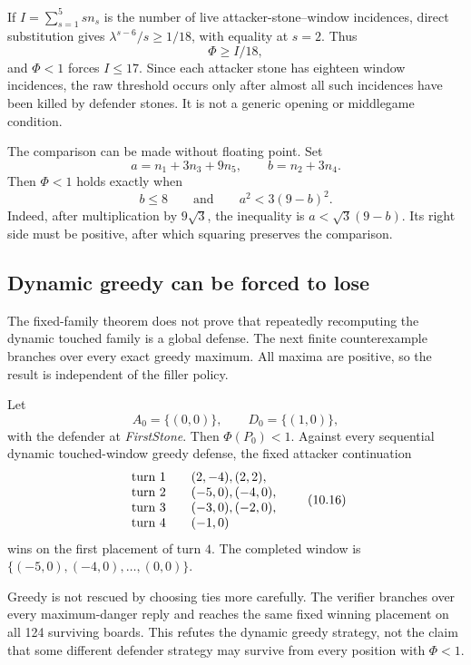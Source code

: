If $I=\sum_{s=1}^{5}s n_s$ is the number of live
attacker-stone--window incidences, direct substitution gives
$\lambda^{s-6}/s\geq1/18$, with equality at $s=2$.  Thus
\[
 \Phi\geq I/18,
\]
and $\Phi<1$ forces $I\leq17$.  Since each attacker stone has eighteen window
incidences, the raw threshold occurs only after almost all such incidences have
been killed by defender stones.  It is not a generic opening or middlegame
condition.

The comparison can be made without floating point.  Set
\[
 a=n_1+3n_3+9n_5,
 \qquad b=n_2+3n_4.
\]
Then $\Phi<1$ holds exactly when
\[
 b\leq8\qquad\text{and}\qquad a^2<3(9-b)^2.
\tag{10.15}
\]
Indeed, after multiplication by $9\sqrt3$, the inequality is
$a<\sqrt3(9-b)$.  Its right side must be positive, after which squaring
preserves the comparison.

\subsection{Dynamic greedy can be forced to lose}

The fixed-family theorem does not prove that repeatedly recomputing the
dynamic touched family is a global defense.  The next finite counterexample
branches over every exact greedy maximum.  All maxima are positive, so the
result is independent of the filler policy.

\begin{theorem}
\label{thm:ES-greedy-refutation}
Let
\[
 A_0=\{(0,0)\},\qquad D_0=\{(1,0)\},
\]
with the defender at \emph{FirstStone}.  Then $\Phi(P_0)<1$.  Against every
sequential dynamic touched-window greedy defense, the fixed attacker
continuation
\[
\begin{array}{c@{\qquad}l}
\text{turn }1 &(2,-4),(2,2),\\
\text{turn }2 &(-5,0),(-4,0),\\
\text{turn }3 &(-3,0),(-2,0),\\
\text{turn }4 &(-1,0)
\end{array}
\tag{10.16}
\]
wins on the first placement of turn $4$.  The completed window is
$\{(-5,0),(-4,0),\ldots,(0,0)\}$.
\end{theorem}

\begin{plainterms}
Greedy is not rescued by choosing ties more carefully.  The verifier branches
over every maximum-danger reply and reaches the same fixed winning placement
on all 124 surviving boards.  This refutes the dynamic greedy strategy, not
the claim that some different defender strategy may survive from every
position with $\Phi<1$.
\end{plainterms}

